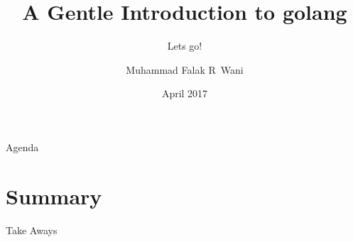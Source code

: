 \documentclass{beamer}
\title{A Gentle Introduction to golang}
\subtitle{Lets go!}
\author{Muhammad Falak R~Wani \\ \inst{falakreyaz@gmail.com}}
\institute[IIIT-D] %
{
  Cybersecurity Education and Research Centre -- {\em (CERC)} \\
  Department of Computer Science\\
  IIIT-D\\
  \centering
  \pgfuseimage{cerc-logo}

}
\date{April 2017}
\begin{document}
\begin{frame}
	\titlepage
\end{frame}

\begin{frame}{Agenda}
	\tableofcontents
\end{frame}

\section*{Summary}

\begin{frame}{Take Aways}
\end{frame}



\end{document}
